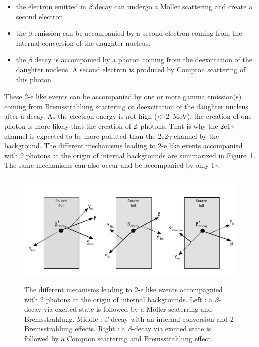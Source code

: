 \documentclass[main.tex]{subfiles}
\begin{document}
\begin{itemize}
\item the electron emitted in $\beta$ decay can undergo a M\"oller scattering and create a second electron.
\item the $\beta$ emission can be accompanied by a second electron coming from the internal conversion of the daughter nucleus.
\item the $\beta$ decay is accompanied by a photon coming from the deexcitation of the daughter nucleus. A second electron is produced by Compton scattering of this photon.
\end{itemize} 


\NI These 2-e like events can be accompanied by one or more gamma emission(s) coming from Bremsstrahlung scattering or deexcitation of the  daughter nucleus after a decay. As the electron energy is not high (<~2~MeV), the creation of one photon is more likely that the creation of 2~photons. That is why the 2e1$\gamma$ channel is expected to be more polluted than the 2e2$\gamma$ channel by the background. The different mechanisms leading to 2-e like events accompanied with 2 photons at the origin of internal backgrounds are summarized in Figure~\ref{InternalBkgPicture}. The same mechanisms can also occur and be accompanied by only 1$\gamma$.



\begin{figure}[h!]
\centering
\includegraphics[scale=0.47]{pictures/Chap6/InternalBkg.pdf}
\label{InternalBkgPicture}
\caption{The different mecanisms leading to 2-e like events accompagnied with 2 photons at the origin of internal backgrounds. Left : a $\beta$-decay via excited state is followed by a M\"oller scaterring and Bremsstrahlung. Middle : $\beta$-decay with an internal conversion and 2 Bremsstrahlung effects. Right :  a $\beta$-decay via excited state is followed by a Compton scattering and Bremsstrahlung effect.}
\end{figure}
\end{document}
